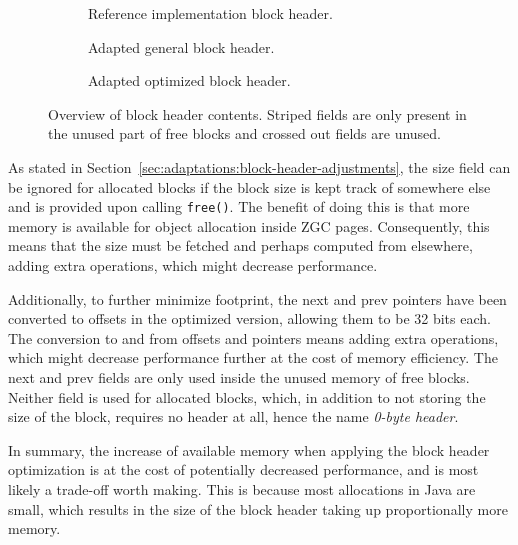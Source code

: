 \begin{figure}[H]
    \centering
    \begin{subfigure}[b]{0.3\textwidth}
        \centering
        
        \caption{Reference implementation block header.}
        \label{fig:blockheader_adap_reference}
    \end{subfigure}%
    \hfill
    \begin{subfigure}[b]{0.3\textwidth}
        \centering
        
        \caption{Adapted general block header.}
        \label{fig:blockheader_adap_general}
    \end{subfigure}%
    \hfill
    \begin{subfigure}[b]{0.3\textwidth}
        \centering
        
        \caption{Adapted optimized block header.}
        \label{fig:blockheader_adap_optimized}
    \end{subfigure}
    \caption{Overview of block header contents. Striped fields are only present in the unused part of free blocks and crossed out fields are unused.}
    \label{fig:blockheader_adaptations}
\end{figure}

As stated in Section~\ref{sec:adaptations:block-header-adjustments}, the size field can be ignored for allocated blocks if the block size is kept track of somewhere else and is provided upon calling \texttt{free()}. The benefit of doing this is that more memory is available for object allocation inside ZGC pages. Consequently, this means that the size must be fetched and perhaps computed from elsewhere, adding extra operations, which might decrease performance. 

Additionally, to further minimize footprint, the next and prev pointers have been converted to offsets in the optimized version, allowing them to be 32 bits each. The conversion to and from offsets and pointers means adding extra operations, which might decrease performance further at the cost of memory efficiency.  The next and prev fields are only used inside the unused memory of free blocks. Neither field is used for allocated blocks, which, in addition to not storing the size of the block, requires no header at all, hence the name \textit{0-byte header}.

In summary, the increase of available memory when applying the block header optimization is at the cost of potentially decreased performance, and is most likely a trade-off worth making. This is because most allocations in Java are small, which results in the size of the block header taking up proportionally more memory.

